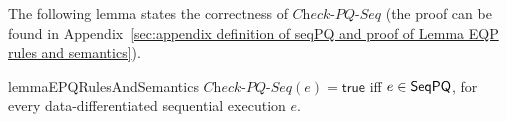 %
%
%
%
%
%
%
%
%

The following lemma states the correctness of $\textit{Check-PQ-Seq}$ (the proof can be found in Appendix~\ref{sec:appendix definition of seqPQ and proof of Lemma EQP rules and semantics}).

\begin{restatable}{lemma}{EPQRulesAndSemantics}
\label{lemma:EPQ rules and semantics}
$\textit{Check-PQ-Seq}(e)=\mathsf{true}$ iff $e\in \mathsf{SeqPQ}$, for every data-differentiated sequential execution $e$.
\end{restatable}

%


